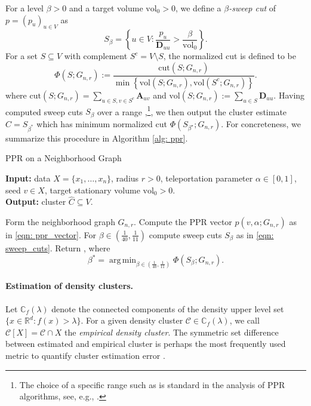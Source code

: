\documentclass{article}
\newcommand{\set}[1]{\left\{#1\right\}}
\newcommand{\vol}{\mathrm{vol}}
\newcommand{\cut}{\mathrm{cut}}
\newcommand{\Reals}{\mathbb{R}}
\newcommand{\Rd}{\Reals^d}
\newcommand{\1}{\mathbf{1}}
\newcommand{\pbf}{p}        %
\newcommand{\Abf}{\mathbf{A}}
\newcommand{\Xbf}{X}             %
\newcommand{\Dbf}{\mathbf{D}}
\newcommand{\Cbb}{\mathbb{C}}
\newcommand{\Cset}{\mathcal{C}}
\newcommand{\Cest}{\widehat{C}}
\DeclareMathOperator*{\argmin}{arg\,min}
\theoremstyle{aldenthm}
\theoremstyle{aldenrmrk}
\begin{document}
For a level $\beta > 0$ and a target volume $\vol_0 > 0$, we define a
\emph{$\beta$-sweep cut} of $\pbf = (p_u)_{u \in V}$ as  
\begin{equation}
\label{eqn: sweep_cuts}
S_\beta = \set{u \in V: \frac{p_u}{\Dbf_{uu}} > \frac{\beta}{\vol_{0}}}.
\end{equation}
For a set $S \subseteq V$ with complement $S^c = V \setminus S$, the normalized cut is defined to be 
\begin{equation}
\label{eqn: normalized_cut}
\Phi(S; G_{n,r}) := \frac{\cut(S;G_{n,r})}{\min \set{\vol(S; G_{n,r}), \vol(S^c; G_{n,r})}}.
\end{equation}
where $\cut(S;G_{n,r}) = \sum_{u \in S, v \in S^c} \Abf_{uv}$ and $\vol(S; G_{n,r}) := \sum_{u \in S} \Dbf_{uu}$. Having computed sweep cuts $S_{\beta}$ over a range ,\footnote{The choice of a specific range such as 
 is standard in the analysis of PPR
algorithms, see, e.g., \citep{zhu2013}.}, we then output the cluster estimate $\widehat{C} = S_{\beta^*}$ which has minimum normalized cut $\Phi(S_{\beta^{\star}}; G_{n,r})$. For concreteness, we summarize this procedure in Algorithm \ref{alg: ppr}.

\begin{algorithm}
	\caption{PPR on a Neighborhood Graph}
	\label{alg: ppr}	
	{\bfseries Input:} data $\Xbf=\{x_1,\ldots,x_n\}$, radius $r > 0$, teleportation 
	parameter $\alpha \in [0,1]$, seed $v \in \Xbf$, target stationary volume $\vol_0 >
	0$. \\   
	{\bfseries Output:} cluster $\Cest \subseteq V$.
	\begin{algorithmic}[1]
		\STATE Form the neighborhood graph $G_{n,r}$.
		\STATE Compute the PPR vector $\pbf(v, \alpha; G_{n,r})$ as in \eqref{eqn:
			ppr_vector}. 
		\STATE For $\beta \in (\frac{1}{40}, \frac{1}{11})$ compute sweep cuts
		$S_{\beta}$ as in \eqref{eqn: sweep_cuts}.
		\STATE Return \smash{$\Cest = S_{\beta^*}$}, where 
		$$
		\beta^* = \argmin_{\beta \in (\frac{1}{40}, \frac{1}{11})} \Phi(S_{\beta}; G_{n,r}).
		$$
	\end{algorithmic}
\end{algorithm}

\paragraph{Estimation of density clusters.}

Let $\Cbb_f(\lambda)$ denote the connected components of the density upper level
set $\{x \in \Rd: f(x) > \lambda\}$.  For a given density cluster $\Cset \in
\Cbb_f(\lambda)$, we call $\Cset[\Xbf] = \Cset \cap \Xbf$ the \emph{empirical
density cluster}. The symmetric set difference between estimated and empirical cluster is perhaps the most frequently used metric to quantify cluster estimation error \citep{korostelev2012,polonik1995,rigollet2009}.
\end{document}
